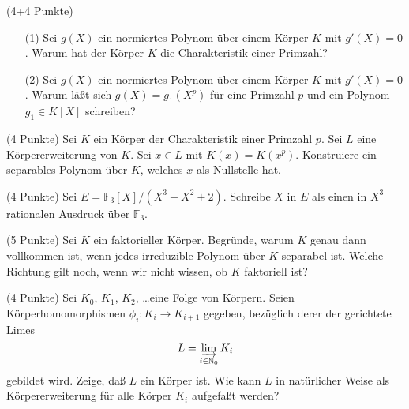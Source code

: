 \documentclass{algsheet}
\begin{document}
\newpage


\begin{exercise}(4+4 Punkte)\vspace{-1ex}
        \begin{itemize}
      \item[(1)]    Sei \(g(X)\) ein normiertes Polynom über einem Körper \(K\) mit \(g'(X) = 0\).
    Warum hat der Körper \(K\) die Charakteristik einer Primzahl?
      \item[(2)]     Sei \(g(X)\) ein normiertes Polynom über einem Körper \(K\) mit \(g'(X) = 0\).
    Warum läßt sich \(g(X) = g_1(X^p)\) für eine Primzahl \(p\) und ein Polynom
    \(g_1 \in K[X]\) schreiben?
   \end{itemize}
\end{exercise}





\begin{exercise}(4 Punkte)\newline
    Sei \(K\) ein Körper der Charakteristik einer Primzahl \(p\).
    Sei \(L\) eine Körpererweiterung von \(K\). Sei \(x \in L\) mit \(K(x) = K(x^p)\).
    Konstruiere ein separables Polynom über \(K\), welches \(x\) als Nullstelle hat.
\end{exercise}

\begin{exercise}(4 Punkte)\newline
    Sei \(E = \mathbb F_3[X]/(X^3 + X^2 + 2)\). Schreibe \(X\) in $E$ als einen in \(X^3\)
    rationalen Ausdruck über \(\mathbb F_3\).
\end{exercise}


\begin{exercise}(5 Punkte)\newline
    Sei \(K\) ein faktorieller Körper. Begründe, warum \(K\) genau dann vollkommen
    ist, wenn jedes irreduzible Polynom über \(K\) separabel ist. Welche Richtung
    gilt noch, wenn wir nicht wissen, ob \(K\) faktoriell ist?
\end{exercise}

\begin{exercise}(4 Punkte)\newline
    Sei \(K_0\), \(K_1\), \(K_2\), \dots eine Folge von Körpern. Seien
    Körperhomomorphismen \(\phi_i\colon K_i \to K_{i + 1}\) gegeben, bezüglich
    derer der gerichtete Limes
    \begin{equation}
        L = \varinjlim_{i \in \mathbb N_0} K_i
    \end{equation}
    gebildet wird. Zeige, daß \(L\) ein Körper ist. 
   \newline    
    Wie kann \(L\) in natürlicher
    Weise als Körpererweiterung für alle Körper \(K_i\) aufgefaßt werden?
\end{exercise}
\end{document}
